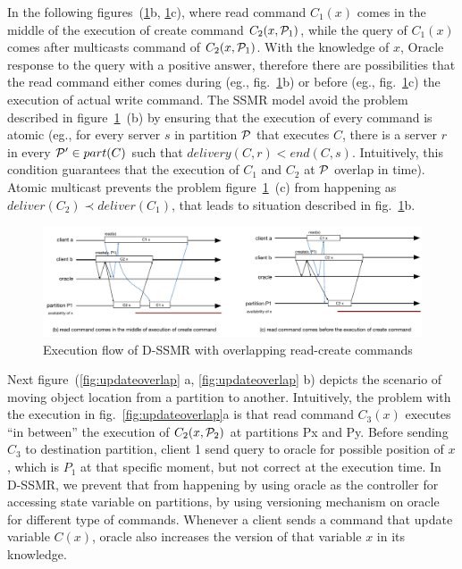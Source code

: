 In the following figures~(\ref{fig:readoverlap}b, \ref{fig:readoverlap}c), where read command $C_1(x)$ comes in the middle of the execution of create command $C_2(x,\mathcal{P}_1)$, while the query of $C_1(x)$ comes after multicasts command of $C_2(x,\mathcal{P}_1)$. With the knowledge of $x$, Oracle response to the query with a positive answer, therefore there are possibilities that the read command either comes during (eg., fig.~\ref{fig:readoverlap}b) or before (eg., fig.~\ref{fig:readoverlap}c) the execution of actual write command. The SSMR model avoid the problem described in figure~\ref{fig:readoverlap}~(b) by ensuring that the execution of every command is atomic (eg., for every server $s$ in partition $\mathcal{P}$ that executes $C$, there is a server $r$ in every $\mathcal{P}' \in part(C)$ such that $delivery(C,r) < end(C,s)$. Intuitively, this condition guarantees that the execution of $C_1$ and $C_2$ at $\mathcal{P}$ overlap in time). Atomic multicast prevents the problem figure~\ref{fig:readoverlap}~(c) from happening as $deliver(C_2) \prec deliver(C_1)$, that leads to situation described in fig.~\ref{fig:readoverlap}b.

\begin{figure}
\begin{minipage}[b]{1.0\linewidth} %
\centering
      \includegraphics[width=1\linewidth]{figures/read_overlap}
\end{minipage}
\caption{Execution flow of D-SSMR with overlapping read-create commands}
\label{fig:readoverlap}
\end{figure}


Next figure~(\ref{fig:updateoverlap} a, \ref{fig:updateoverlap} b) depicts the scenario of moving object location from a partition to another. Intuitively, the problem with the execution in fig.~\ref{fig:updateoverlap}a is that read command $C_3(x)$ executes “in between” the execution of $C_2(x,\mathcal{P}_2)$ at partitions Px and Py. Before sending $C_3$ to destination partition, client 1 send query to oracle for possible position of $x$, which is $P_1$ at that specific moment, but not correct at the execution time. In D-SSMR, we prevent that from happening by using oracle as the controller for accessing state variable on partitions, by using versioning mechanism on oracle for different type of commands. Whenever a client sends a command that update variable $C(x)$, oracle also increases the version of that variable $x$ in its knowledge. 

